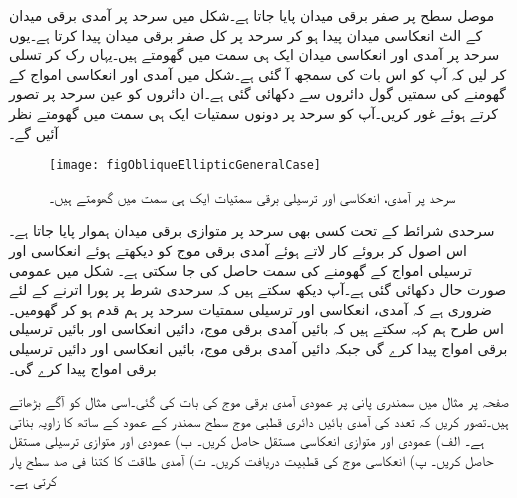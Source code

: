 موصل سطح پر صفر برقی میدان پایا جاتا ہے۔شکل  میں سرحد پر آمدی برقی میدان کے الٹ انعکاسی میدان پیدا ہو کر سرحد پر کل صفر برقی میدان پیدا کرتا ہے۔یوں سرحد پر آمدی اور انعکاسی میدان ایک ہی سمت میں گھومتے ہیں۔یہاں رک کر تسلی کر لیں کہ آپ کو اس بات کی سمجھ آ گئی ہے۔شکل میں آمدی اور انعکاسی امواج کے گھومنے کی سمتیں گول دائروں سے دکھائی گئی ہے۔ان دائروں کو عین سرحد پر تصور کرتے ہوئے غور کریں۔آپ کو سرحد پر دونوں سمتیات ایک ہی سمت میں گھومتے نظر آئیں گے۔   
 
\begin{figure}
\centering
\texttt{[image: figObliqueEllipticGeneralCase]}
\caption{سرحد پر آمدی، انعکاسی اور ترسیلی برقی سمتیات ایک ہی سمت میں گھومتے ہیں۔}
\label{شکل_قطبیت_عمومی_صورت}
\end{figure}

سرحدی شرائط کے تحت کسی بھی سرحد پر متوازی برقی میدان ہموار پایا جاتا ہے۔اس اصول کر بروئے کار لاتے ہوئے آمدی برقی موج کو دیکھتے ہوئے انعکاسی اور ترسیلی امواج کے گھومنے کی سمت حاصل کی جا سکتی ہے۔ شکل  میں عمومی صورت حال دکھائی گئی ہے۔آپ دیکھ سکتے ہیں کہ سرحدی شرط پر پورا اترنے کے لئے ضروری ہے کہ آمدی، انعکاسی اور ترسیلی سمتیات سرحد پر ہم قدم ہو کر گھومیں۔ اس طرح ہم کہہ سکتے ہیں کہ بائیں آمدی برقی موج، دائیں انعکاسی اور بائیں ترسیلی برقی امواج پیدا کرے گی جبکہ دائیں آمدی برقی موج، بائیں انعکاسی اور دائیں ترسیلی برقی امواج پیدا کرے گی۔ 

صفحہ  پر مثال  میں سمندری پانی
  پر عمودی آمدی برقی موج کی بات کی گئی۔اسی مثال کو آگے بڑھاتے ہیں۔تصور کریں کہ  تعدد کی آمدی بائیں دائری قطبی موج سطح سمندر کے عمود کے ساتھ  کا زاویہ بناتی ہے۔ الف) عمودی اور متوازی انعکاسی مستقل حاصل کریں۔ ب) عمودی اور متوازی ترسیلی مستقل حاصل کریں۔ پ) انعکاسی موج کی قطبیت دریافت کریں۔ ت) آمدی طاقت کا کتنا فی صد سطح پار کرتی ہے۔

